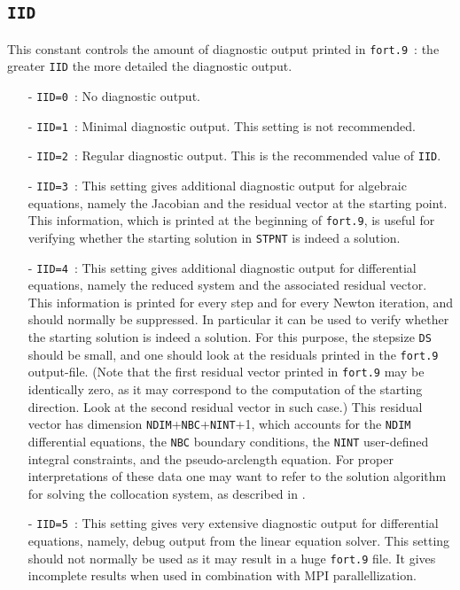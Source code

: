 \documentclass[12pt]{report}
\begin{document}
\subsection{\texttt{IID}} \label{sec:IID} 
 This constant controls the amount of diagnostic output printed in {\tt fort.9}~:
 the greater {\tt IID} the more detailed the diagnostic output.
\begin{itemize}
\item[-] {\tt IID=0}~:  
  No diagnostic output.
\item[-] {\tt IID=1}~:  
  Minimal diagnostic output. This setting is not recommended.
\item[-] {\tt IID=2}~: 
  Regular diagnostic output. This is the recommended value of {\tt IID}.
\item[-] {\tt IID=3}~: 
  This setting gives additional diagnostic output for algebraic equations,
  namely the Jacobian and the residual vector at the starting point.
  This information, which is printed at the beginning of {\tt fort.9},
  is useful for verifying whether the starting solution in {\tt STPNT} is indeed 
  a solution.
\item[-] {\tt IID=4}~: 
  This setting gives additional diagnostic output for differential equations,
  namely the reduced system and the associated residual vector. 
  This information is printed for every step and for every Newton iteration,
  and should normally be suppressed.
  In particular it can be used to verify whether the starting solution
  is indeed a solution. For this purpose, the stepsize {\tt DS} should
  be small, and one should look at the residuals printed in the {\tt fort.9}
  output-file. (Note that the first residual vector printed in {\tt fort.9} may
  be identically zero, as it may correspond to the computation of the starting
  direction. Look at the second residual vector in such case.)
  This residual vector has dimension 
  {\tt NDIM}+{\tt NBC}+{\tt NINT}+1, which accounts for the {\tt NDIM}
  differential equations, the {\tt NBC} boundary conditions, the {\tt NINT} user-defined
  integral constraints, and the pseudo-arclength equation.
  For proper interpretations of these data one may want to refer to the solution
  algorithm for solving the collocation system, as described in
   \citeyear{DoKeKe:91b}.
\item[-] {\tt IID=5}~:
  This setting gives very extensive diagnostic output for differential equations,
  namely, debug output from the linear equation solver.
  This setting should not normally be used as it may result
  in a huge {\tt fort.9} file. It gives incomplete results when
  used in combination with MPI parallellization.
\end{itemize}
\end{document}

